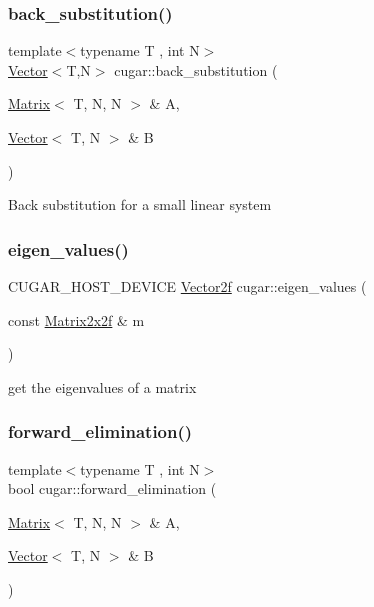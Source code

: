 \subsubsection{\texorpdfstring{back\+\_\+substitution()}{back\_substitution()}}
{\footnotesize\ttfamily template$<$typename T , int N$>$ \\
\hyperlink{structcugar_1_1_vector}{Vector}$<$T,N$>$ cugar\+::back\+\_\+substitution (\begin{DoxyParamCaption}\item[{\hyperlink{structcugar_1_1_matrix}{Matrix}$<$ T, N, N $>$ \&}]{A,  }\item[{\hyperlink{structcugar_1_1_vector}{Vector}$<$ T, N $>$ \&}]{B }\end{DoxyParamCaption})}

Back substitution for a small linear system \mbox{\label{group___matrices_module_gac5e231e656dbe04b10efcd989ef39874}} 
\subsubsection{\texorpdfstring{eigen\+\_\+values()}{eigen\_values()}}
{\footnotesize\ttfamily C\+U\+G\+A\+R\+\_\+\+H\+O\+S\+T\+\_\+\+D\+E\+V\+I\+CE \hyperlink{structcugar_1_1_vector}{Vector2f} cugar\+::eigen\+\_\+values (\begin{DoxyParamCaption}\item[{const \hyperlink{structcugar_1_1_matrix}{Matrix2x2f} \&}]{m }\end{DoxyParamCaption})\hspace{0.3cm}{\ttfamily [inline]}}

get the eigenvalues of a matrix \mbox{\label{group___matrices_module_ga779124249c080805739c3c6332bef28c}} 
\subsubsection{\texorpdfstring{forward\+\_\+elimination()}{forward\_elimination()}}
{\footnotesize\ttfamily template$<$typename T , int N$>$ \\
bool cugar\+::forward\+\_\+elimination (\begin{DoxyParamCaption}\item[{\hyperlink{structcugar_1_1_matrix}{Matrix}$<$ T, N, N $>$ \&}]{A,  }\item[{\hyperlink{structcugar_1_1_vector}{Vector}$<$ T, N $>$ \&}]{B }\end{DoxyParamCaption})}

